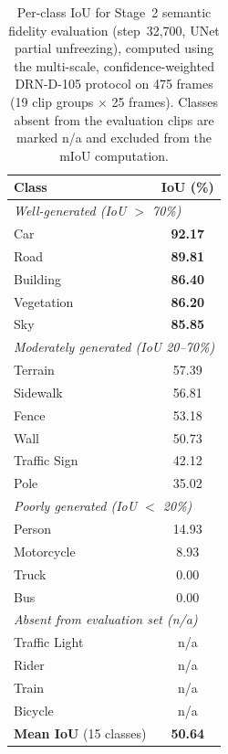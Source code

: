 \begin{table}[t]
    \centering
    \caption{Per-class IoU for Stage~2 semantic fidelity evaluation (step~32,700, UNet partial unfreezing), computed using the multi-scale, confidence-weighted DRN-D-105 protocol on 475 frames (19 clip groups $\times$ 25 frames). Classes absent from the evaluation clips are marked n/a and excluded from the mIoU computation.}
    \label{tab:stage2_per_class}
    \begin{tabular}{lc}
        \toprule
        \textbf{Class} & \textbf{IoU (\%)} \\
        \midrule
        \multicolumn{2}{l}{\textit{Well-generated (IoU $>$ 70\%)}} \\
        Car          & \textbf{92.17} \\
        Road         & \textbf{89.81} \\
        Building     & \textbf{86.40} \\
        Vegetation   & \textbf{86.20} \\
        Sky          & \textbf{85.85} \\
        \midrule
        \multicolumn{2}{l}{\textit{Moderately generated (IoU 20--70\%)}} \\
        Terrain      & 57.39 \\
        Sidewalk     & 56.81 \\
        Fence        & 53.18 \\
        Wall         & 50.73 \\
        Traffic Sign & 42.12 \\
        Pole         & 35.02 \\
        \midrule
        \multicolumn{2}{l}{\textit{Poorly generated (IoU $<$ 20\%)}} \\
        Person       & 14.93 \\
        Motorcycle   & 8.93 \\
        Truck        & 0.00 \\
        Bus          & 0.00 \\
        \midrule
        \multicolumn{2}{l}{\textit{Absent from evaluation set (n/a)}} \\
        Traffic Light & n/a \\
        Rider         & n/a \\
        Train         & n/a \\
        Bicycle       & n/a \\
        \midrule
        \textbf{Mean IoU} (15 classes) & \textbf{50.64} \\
        \bottomrule
    \end{tabular}
\end{table}

